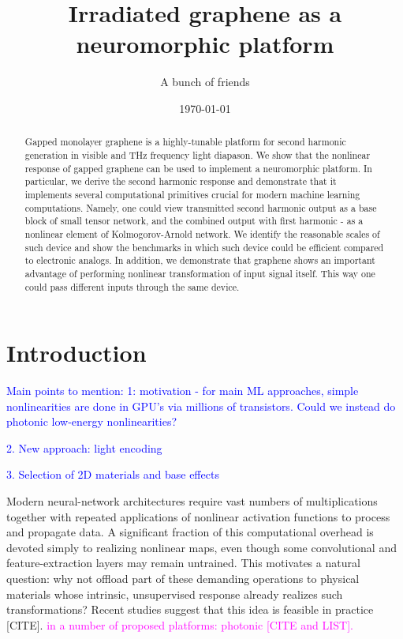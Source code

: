 \documentclass[twocolumn,aps,prb,superscriptaddress,longbibliography]{revtex4-2}
\newcommand{\addDO}[1]{\textcolor{blue}{#1}}
\begin{document}
 \title{Irradiated graphene as a neuromorphic platform}
 
	\date{\today}

    \author{A bunch of friends}
	
	\begin{abstract}
		Gapped monolayer graphene is a highly-tunable platform for second harmonic generation in visible and THz frequency light 
		diapason. We show that the nonlinear response of gapped graphene can be used to implement a neuromorphic platform. 
		In particular, we derive the second harmonic response and demonstrate that it implements several computational 
		primitives crucial for modern machine learning computations. Namely, one could view transmitted second harmonic 
		output as a base block of small tensor network, and the combined output with first harmonic - as a nonlinear element 
		of Kolmogorov-Arnold network. We identify the reasonable scales of such device and show the benchmarks in which 
		such device could be efficient compared to electronic analogs. In addition, we demonstrate that graphene shows an 
		important advantage of performing nonlinear transformation of input signal itself. This way one could pass different 
		inputs through the same device.  
	\end{abstract}
	\maketitle

\section{Introduction}

\addDO{Main points to mention:}
\addDO{1: motivation - for main ML approaches, simple nonlinearities are done in GPU's via millions of transistors. Could we instead do photonic low-energy nonlinearities?}

\addDO{2. New approach: light encoding}

\addDO{3. Selection of 2D materials and base effects}

Modern neural-network architectures require vast numbers of multiplications together with repeated applications of nonlinear activation functions to process and propagate data. A significant fraction of this computational overhead is devoted simply to realizing nonlinear maps, even though some convolutional and feature-extraction layers may remain untrained. This motivates a natural question: why not offload part of these demanding operations to physical materials whose intrinsic, unsupervised response already realizes such transformations? Recent studies suggest that this idea is feasible in practice [CITE]. \textcolor{magenta}{in a number of proposed platforms: photonic \cite{Wetzstein2020,Wright2022} [CITE and LIST].} 
\end{document}
